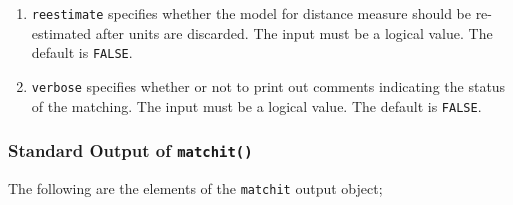 \documentclass[oneside,letterpaper,titlepage]{article}
\begin{document}
\begin{enumerate}
\item \texttt{reestimate} specifies whether the model for distance
  measure should be re-estimated after units are discarded. The input
  must be a logical value. The default is \texttt{FALSE}.

\item \texttt{verbose} specifies whether or not to print out comments
  indicating the status of the matching. The input must be a logical
  value. The default is \texttt{FALSE}.
\end{enumerate}

\subsubsection{Standard Output of \texttt{matchit()}}

The following are the elements of the \texttt{matchit} output object;
\end{document}

